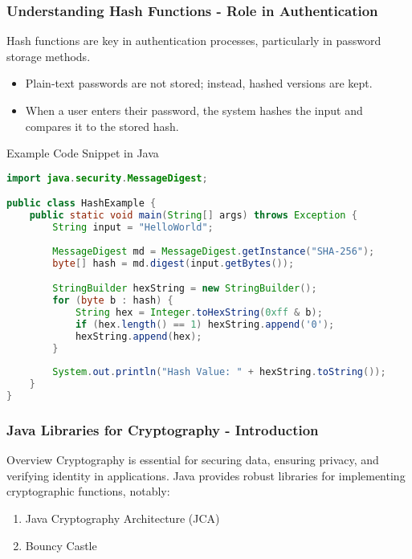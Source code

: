\documentclass{beamer}
\begin{document}
\begin{frame}[fragile]
    \frametitle{Understanding Hash Functions - Role in Authentication}
    Hash functions are key in authentication processes, particularly in password storage methods.

    \begin{itemize}
        \item Plain-text passwords are not stored; instead, hashed versions are kept.
        \item When a user enters their password, the system hashes the input and compares it to the stored hash.
    \end{itemize}

    \begin{block}{Example Code Snippet in Java}
        \begin{lstlisting}[language=Java]
import java.security.MessageDigest;

public class HashExample {
    public static void main(String[] args) throws Exception {
        String input = "HelloWorld";
        
        MessageDigest md = MessageDigest.getInstance("SHA-256");
        byte[] hash = md.digest(input.getBytes());

        StringBuilder hexString = new StringBuilder();
        for (byte b : hash) {
            String hex = Integer.toHexString(0xff & b);
            if (hex.length() == 1) hexString.append('0');
            hexString.append(hex);
        }
        
        System.out.println("Hash Value: " + hexString.toString());
    }
}
        \end{lstlisting}
    \end{block}
\end{frame}

\begin{frame}[fragile]
    \frametitle{Java Libraries for Cryptography - Introduction}
    \begin{block}{Overview}
        Cryptography is essential for securing data, ensuring privacy, and verifying identity in applications. Java provides robust libraries for implementing cryptographic functions, notably:
    \end{block}
    \begin{enumerate}
        \item Java Cryptography Architecture (JCA)
        \item Bouncy Castle
    \end{enumerate}
\end{frame}
\end{document}
